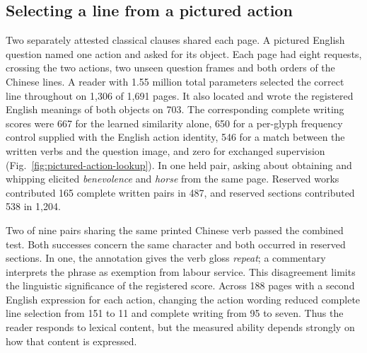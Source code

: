 \subsection*{Selecting a line from a pictured action}
Two separately attested classical clauses shared each page. A pictured English question named one action and asked for its object. Each page had eight requests, crossing the two actions, two unseen question frames and both orders of the Chinese lines. A reader with 1.55 million total parameters selected the correct line throughout on 1,306 of 1,691 pages. It also located and wrote the registered English meanings of both objects on 703. The corresponding complete writing scores were 667 for the learned similarity alone, 650 for a per-glyph frequency control supplied with the English action identity, 546 for a match between the written verbs and the question image, and zero for exchanged supervision (Fig.~\ref{fig:pictured-action-lookup}). In one held pair, asking about obtaining and whipping elicited \textit{benevolence} and \textit{horse} from the same page. Reserved works contributed 165 complete written pairs in 487, and reserved sections contributed 538 in 1,204.

Two of nine pairs sharing the same printed Chinese verb passed the combined test. Both successes concern the same character and both occurred in reserved sections. In one, the annotation gives the verb gloss \textit{repeat}; a commentary interprets the phrase as exemption from labour service. This disagreement limits the linguistic significance of the registered score. Across 188 pages with a second English expression for each action, changing the action wording reduced complete line selection from 151 to 11 and complete writing from 95 to seven. Thus the reader responds to lexical content, but the measured ability depends strongly on how that content is expressed.

